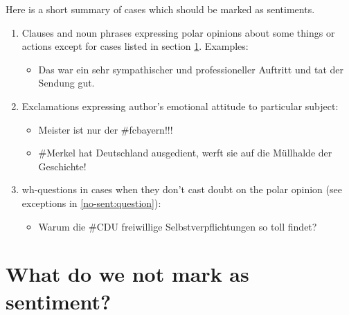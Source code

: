 \documentclass[11pt,a4paper]{article}
\begin{document}
Here is a short summary of cases which should be marked as sentiments.
\begin{enumerate}
\item Clauses and noun phrases expressing polar opinions about some
  things or actions except for cases listed in section
  \ref{sec:not-sentiment}. Examples:
  \begin{itemize}
  \item Das war ein sehr sympathischer und professioneller
    Auftritt und tat der Sendung gut.
  \end{itemize}

\item Exclamations expressing author's emotional attitude to
  particular subject:
  \begin{itemize}
  \item Meister ist nur der \#{}fcbayern!!!
  \item \#{}Merkel hat Deutschland ausgedient, werft sie auf die M\"ullhalde
    der Geschichte!
  \end{itemize}

\item wh-questions in cases when they don't cast doubt on the polar
  opinion (see exceptions in \ref{no-sent:question}):
  \begin{itemize}
  \item Warum die \#{}CDU freiwillige Selbstverpflichtungen so toll findet?
  \end{itemize}
\end{enumerate}


\section{What do we not mark as sentiment?}\label{sec:not-sentiment}
\end{document}
